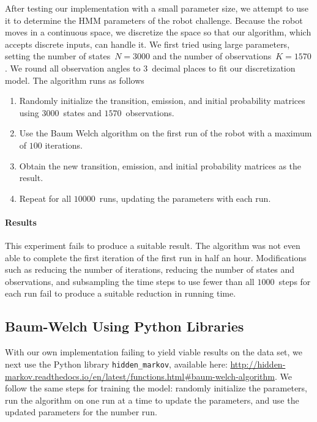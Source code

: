 \documentclass[twoside]{article}
\begin{document}
After testing our implementation with a small parameter size, we attempt to use it to determine the HMM parameters of the robot challenge.
Because the robot moves in a continuous space, we discretize the space so that our algorithm, which accepts discrete inputs, can handle it.
We first tried using large parameters, setting the number of states~${N = \num{3000}}$ and the number of observations~${K = \num{1570}}$.
We round all observation angles to $3$~decimal places to fit our discretization model.
The algorithm runs as follows
\begin{enumerate}
  \item Randomly initialize the transition, emission, and initial probability matrices using $\num{3000}$~states and $\num{1570}$~observations.
  \item Use the Baum Welch algorithm on the first run of the robot with a maximum of $\num{100}$ iterations.
  \item Obtain the new transition, emission, and initial probability matrices as the result.
  \item Repeat for all $\num{10000}$~runs, updating the parameters with each run.
\end{enumerate}

\paragraph{Results}

This experiment fails to produce a suitable result.
The algorithm was not even able to complete the first iteration of the first run in half an hour.
Modifications such as reducing the number of iterations, reducing the number of states and observations, and subsampling the time steps to use fewer than all $\num{1000}$~steps for each run fail to produce a suitable reduction in running time.

\subsection{Baum-Welch Using Python Libraries}
\label{sec:bw-python-libs}


With our own implementation failing to yield viable results on the data set, we next use the Python library \texttt{\small hidden\_markov}, available here: {\small\url{http://hidden-markov.readthedocs.io/en/latest/functions.html#baum-welch-algorithm}}.
We follow the same steps for training the model: randomly initialize the parameters, run the algorithm on one run at a time to update the parameters, and use the updated parameters for the number run.
\end{document}
